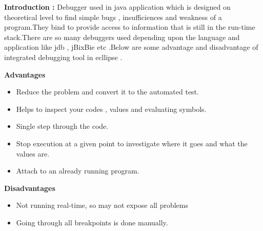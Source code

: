 \documentclass[12pt]{report}
\begin{document}
     \item \textbf{Introduction : } Debugger used in java application which is designed on theoretical level to find simple bugs , insufficiences and weakness of a program.They bind to provide access to information that is still in the run-time stack.There are so many debuggers used depending upon the language and application like jdb , jBixBie etc .Below are some advantage and disadvantage of integrated debugging tool in ecllipse .\\
     
     \item\textbf{Advantages}
     \begin{itemize}
       \item Reduce the problem and convert it to the automated test.
    \item Helps to inspect your codes , values and evaluating symbols.
    \item Single step through the code.
    \item Stop execution at a given point to investigate where it goes and what the values are.
    \item Attach to an already running program.
    \end{itemize}
     \item\textbf{Disadvantages}
     \begin{itemize}
     \item Not running real-time, so may not expose all problems
    \item Going through all breakpoints is done manually.
 \end{itemize}
\clearpage
   
\end{document}
